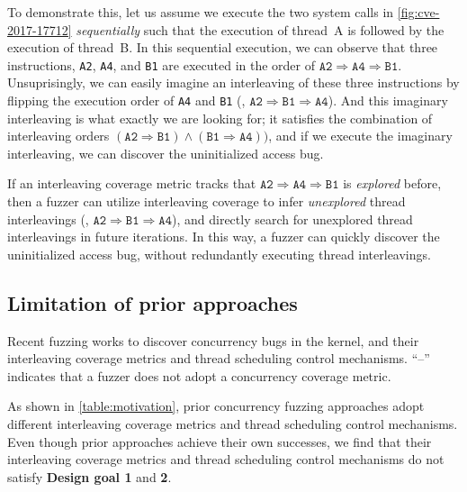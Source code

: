 To demonstrate this, let us assume we execute the two system calls in
\autoref{fig:cve-2017-17712} \textit{sequentially} such that the
execution of thread~A is followed by the execution of thread~B.
%
In this sequential execution, we can observe that three instructions,
\texttt{A2}, \texttt{A4}, and \texttt{B1} are executed in the order of
$\texttt{A2} \Rightarrow \texttt{A4} \Rightarrow \texttt{B1}$.
%
Unsuprisingly, we can easily imagine an interleaving of these three
instructions by flipping the execution order of \texttt{A4} and
\texttt{B1} (\ie,
$\texttt{A2} \Rightarrow \texttt{B1} \Rightarrow \texttt{A4}$).
%
And this imaginary interleaving is what exactly we are looking for; it
satisfies the combination of interleaving orders
$(\texttt{A2} \Rightarrow \texttt{B1}) \wedge (\texttt{B1} \Rightarrow
\texttt{A4}))$, and if we execute the imaginary interleaving, we can
discover the uninitialized access bug.

%
%
If an interleaving coverage metric tracks that
$\texttt{A2} \Rightarrow \texttt{A4} \Rightarrow \texttt{B1}$ is
\textit{explored} before, then a fuzzer can utilize interleaving
coverage to infer \textit{unexplored} thread interleavings (\eg,
$\texttt{A2} \Rightarrow \texttt{B1} \Rightarrow \texttt{A4}$), and
directly search for unexplored thread interleavings in future
iterations.
%
In this way, a fuzzer can quickly discover the uninitialized access
bug, without redundantly executing thread interleavings.



\subsection{Limitation of prior approaches}
\label{ss:existingapproaches}

\begin{table}[t]
  \centering
  
  \caption{Recent fuzzing works to discover concurrency bugs in the
    kernel, and their interleaving coverage metrics and thread
    scheduling control mechanisms. ``--'' indicates that a fuzzer
    does not adopt a concurrency coverage metric.}
  \label{table:motivation}
\end{table}

As shown in \autoref{table:motivation}, prior concurrency fuzzing
approaches adopt different interleaving coverage metrics and thread
scheduling control mechanisms.
%
Even though prior approaches achieve their own successes, we find that
their interleaving coverage metrics and thread scheduling control
mechanisms do not satisfy \textbf{Design goal 1} and \textbf{2}.


